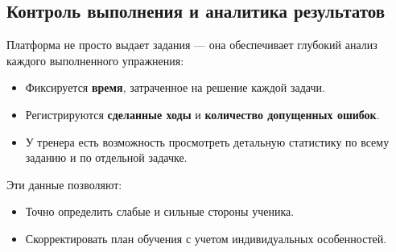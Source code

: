 \documentclass[a4paper,12pt]{article}
\begin{document}
\subsection{Контроль выполнения и аналитика результатов}

Платформа не просто выдает задания --- она обеспечивает глубокий анализ каждого выполненного упражнения:
\begin{itemize}
    \item Фиксируется \textbf{время}, затраченное на решение каждой задачи.
    \item Регистрируются \textbf{сделанные ходы} и \textbf{количество допущенных ошибок}.
    \item У тренера есть возможность просмотреть детальную статистику по всему заданию и по отдельной задачке.
\end{itemize}
Эти данные позволяют:
\begin{itemize}
    \item Точно определить слабые и сильные стороны ученика.
    \item Скорректировать план обучения с учетом индивидуальных особенностей.
\end{itemize}
\end{document}
